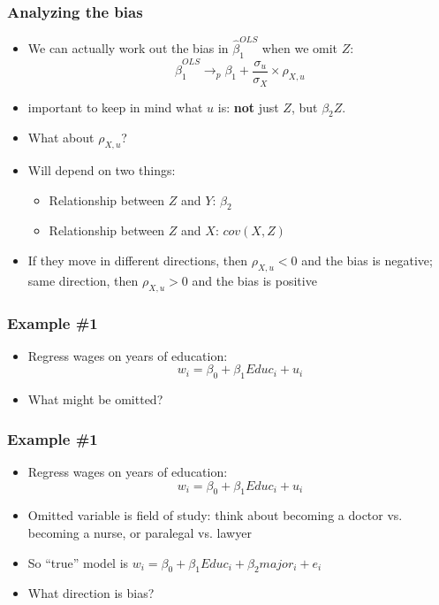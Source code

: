 \documentclass[aspectratio=169]{beamer}
\begin{document}
\begin{frame}
    \frametitle{Analyzing the bias}
    \begin{itemize}
        \item We can actually work out the bias in $\hat{\beta}_1^{OLS}$ when we omit $Z$:
        $$
            \hat{\beta}_1^{OLS} \rightarrow_p \beta_1 + \dfrac{\sigma_u}{\sigma_X} \times \rho_{X,u}
        $$
        \item important to keep in mind what $u$ is: \textbf{not} just $Z$, but $\beta_2 Z$.
        \item What about $\rho_{X,u}$?
        \item Will depend on two things: 
        \begin{itemize}
            \item Relationship between $Z$ and $Y$: $\beta_2$ 
            \item Relationship between $Z$ and $X$: $cov(X,Z)$ 
        \end{itemize}
        \item If they move in different directions, then $\rho_{X,u} < 0$ and the bias is negative; same direction, then $\rho_{X,u} > 0$ and the bias is positive
    \end{itemize}
\end{frame}

\begin{frame}
    \frametitle{Example \#1}
    \begin{itemize}
        \item Regress wages on years of education:
        $$ 
            w_i = \beta_0 + \beta_1 Educ_i + u_i
        $$
        \item What might be omitted?
    \end{itemize}
\end{frame}


\begin{frame}
    \frametitle{Example \#1}
    \begin{itemize}
        \item Regress wages on years of education:
        $$ 
            w_i = \beta_0 + \beta_1 Educ_i + u_i
        $$
        \item Omitted variable is field of study: think about becoming a doctor vs. becoming a nurse, or paralegal vs. lawyer
        \item So ``true'' model is $w_i = \beta_0 + \beta_1 Educ_i + \beta_2 major_i + e_i$
        \item What direction is bias?
    \end{itemize}
\end{frame}
\end{document}
